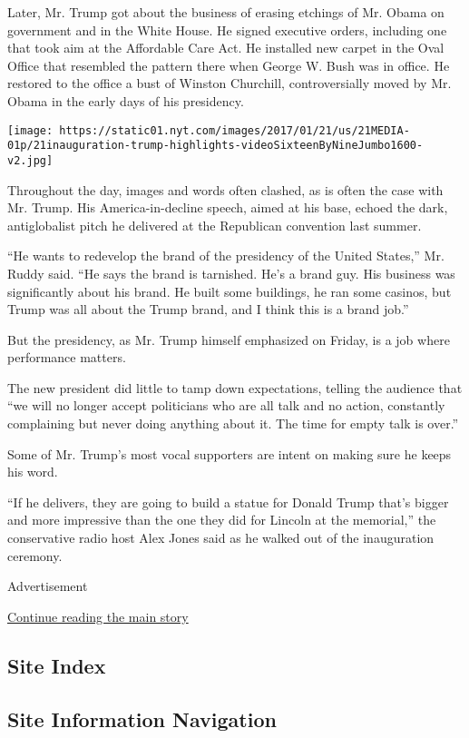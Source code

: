 Later, Mr. Trump got about the business of erasing etchings of Mr. Obama
on government and in the White House. He signed executive orders,
including one that took aim at the Affordable Care Act. He installed new
carpet in the Oval Office that resembled the pattern there when George
W. Bush was in office. He restored to the office a bust of Winston
Churchill, controversially moved by Mr. Obama in the early days of his
presidency.

\texttt{[image: https://static01.nyt.com/images/2017/01/21/us/21MEDIA-01p/21inauguration-trump-highlights-videoSixteenByNineJumbo1600-v2.jpg]}

Throughout the day, images and words often clashed, as is often the case
with Mr. Trump. His America-in-decline speech, aimed at his base, echoed
the dark, antiglobalist pitch he delivered at the Republican convention
last summer.

``He wants to redevelop the brand of the presidency of the United
States,'' Mr. Ruddy said. ``He says the brand is tarnished. He's a brand
guy. His business was significantly about his brand. He built some
buildings, he ran some casinos, but Trump was all about the Trump brand,
and I think this is a brand job.''

But the presidency, as Mr. Trump himself emphasized on Friday, is a job
where performance matters.

The new president did little to tamp down expectations, telling the
audience that ``we will no longer accept politicians who are all talk
and no action, constantly complaining but never doing anything about it.
The time for empty talk is over.''

Some of Mr. Trump's most vocal supporters are intent on making sure he
keeps his word.

``If he delivers, they are going to build a statue for Donald Trump
that's bigger and more impressive than the one they did for Lincoln at
the memorial,'' the conservative radio host Alex Jones said as he walked
out of the inauguration ceremony.

Advertisement

\protect\hyperlink{after-bottom}{Continue reading the main story}

\hypertarget{site-index}{%
\subsection{Site Index}\label{site-index}}

\hypertarget{site-information-navigation}{%
\subsection{Site Information
Navigation}\label{site-information-navigation}}

